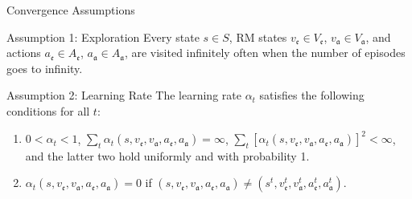 \documentclass[10pt, aspectratio=169]{beamer}
\begin{document}
\begin{frame}{Convergence Assumptions}
    \begin{block}{Assumption 1: Exploration}
        Every state $s \in S$, RM states $v_{\mathfrak{e}} \in V_{\mathfrak{e}}$, $v_{\mathfrak{a}} \in V_{\mathfrak{a}}$, and actions $a_{\mathfrak{e}} \in A_{\mathfrak{e}}$, $a_{\mathfrak{a}} \in A_{\mathfrak{a}}$, are visited infinitely often when the number of episodes goes to infinity. 
    \end{block}
    \vspace{0.2cm}

    \begin{block}{Assumption 2: Learning Rate}
        The learning rate $\alpha_t$ satisfies the following conditions for all $t$:
        \begin{enumerate}
            \item $0 < \alpha_t < 1$, $\sum_t \alpha_t(s, v_{\mathfrak{e}}, v_{\mathfrak{a}}, a_{\mathfrak{e}}, a_{\mathfrak{a}}) = \infty$, $\sum_t [\alpha_t(s, v_{\mathfrak{e}}, v_{\mathfrak{a}}, a_{\mathfrak{e}}, a_{\mathfrak{a}})]^2 < \infty$, and the latter two hold uniformly and with probability 1. 
            \item $\alpha_t(s, v_{\mathfrak{e}}, v_{\mathfrak{a}}, a_{\mathfrak{e}}, a_{\mathfrak{a}}) = 0$ if $(s, v_{\mathfrak{e}}, v_{\mathfrak{a}}, a_{\mathfrak{e}}, a_{\mathfrak{a}}) \neq (s^t, v_{\mathfrak{e}}^t, v_{\mathfrak{a}}^t, a_{\mathfrak{e}}^t, a_{\mathfrak{a}}^t)$.
        \end{enumerate}
    \end{block}
\end{frame}
\end{document}
